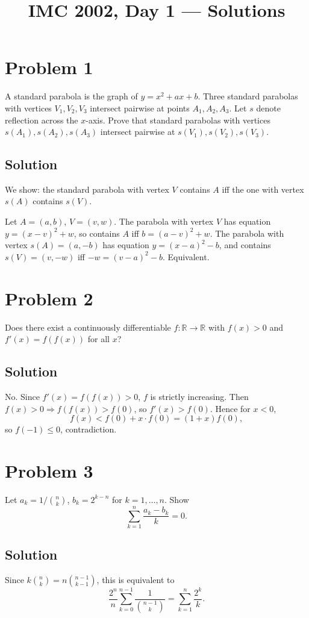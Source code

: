 \documentclass{article}
\title{IMC 2002, Day 1 --- Solutions}
\begin{document}
\maketitle

\section*{Problem 1}
A standard parabola is the graph of $y = x^2 + ax + b$. Three standard parabolas with vertices $V_1, V_2, V_3$ intersect pairwise at points $A_1, A_2, A_3$. Let $s$ denote reflection across the $x$-axis. Prove that standard parabolas with vertices $s(A_1), s(A_2), s(A_3)$ intersect pairwise at $s(V_1), s(V_2), s(V_3)$.

\subsection*{Solution}
We show: the standard parabola with vertex $V$ contains $A$ iff the one with vertex $s(A)$ contains $s(V)$.

Let $A=(a,b)$, $V=(v,w)$. The parabola with vertex $V$ has equation $y=(x-v)^2+w$, so contains $A$ iff $b=(a-v)^2+w$. The parabola with vertex $s(A)=(a,-b)$ has equation $y=(x-a)^2-b$, and contains $s(V)=(v,-w)$ iff $-w=(v-a)^2-b$. Equivalent.

\section*{Problem 2}
Does there exist a continuously differentiable $f:\mathbb{R}\to\mathbb{R}$ with $f(x)>0$ and $f'(x)=f(f(x))$ for all $x$?

\subsection*{Solution}
No. Since $f'(x)=f(f(x))>0$, $f$ is strictly increasing. Then $f(x)>0 \Rightarrow f(f(x))>f(0)$, so $f'(x)>f(0)$. Hence for $x<0$,
\[f(x) < f(0) + x\cdot f(0) = (1+x)f(0),\]
so $f(-1)\le 0$, contradiction.

\section*{Problem 3}
Let $a_k = 1/\binom{n}{k}$, $b_k = 2^{k-n}$ for $k=1,\dots,n$. Show
\[\sum_{k=1}^n \frac{a_k - b_k}{k} = 0.\]

\subsection*{Solution}
Since $k\binom{n}{k} = n\binom{n-1}{k-1}$, this is equivalent to
\[\frac{2^n}{n}\sum_{k=0}^{n-1}\frac{1}{\binom{n-1}{k}} = \sum_{k=1}^n \frac{2^k}{k}. \tag{2}\]
\end{document}
